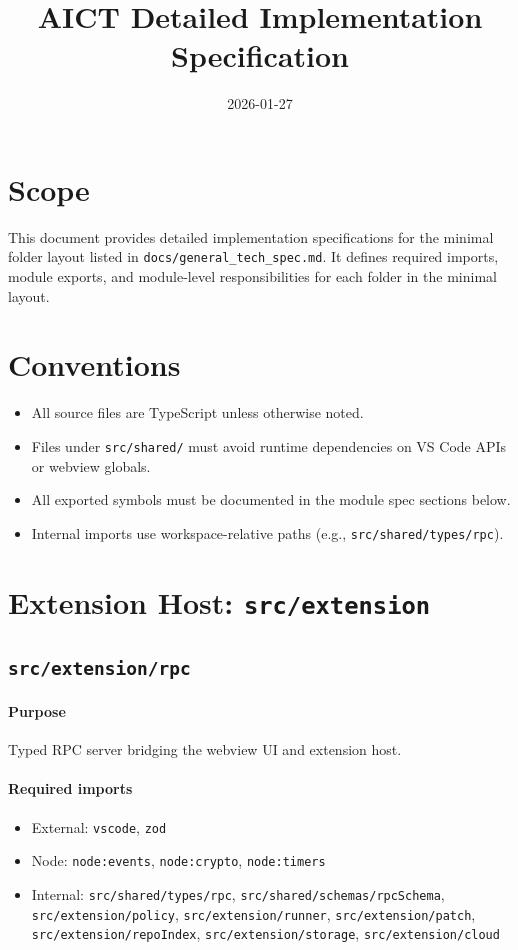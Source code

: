 \documentclass[11pt]{article}
\title{AICT Detailed Implementation Specification}
\author{}
\date{2026-01-27}
\begin{document}
\maketitle
\tableofcontents

\section{Scope}
This document provides detailed implementation specifications for the minimal folder layout
listed in \texttt{docs/general\_tech\_spec.md}. It defines required imports, module exports, and
module-level responsibilities for each folder in the minimal layout.

\section{Conventions}
\begin{itemize}[noitemsep]
  \item All source files are TypeScript unless otherwise noted.
  \item Files under \texttt{src/shared/} must avoid runtime dependencies on VS Code APIs or webview globals.
  \item All exported symbols must be documented in the module spec sections below.
  \item Internal imports use workspace-relative paths (e.g., \texttt{src/shared/types/rpc}).
\end{itemize}

\section{Extension Host: \texttt{src/extension}}

\subsection{\texttt{src/extension/rpc}}
\paragraph{Purpose} Typed RPC server bridging the webview UI and extension host.

\paragraph{Required imports}
\begin{itemize}[noitemsep]
  \item External: \texttt{vscode}, \texttt{zod}
  \item Node: \texttt{node:events}, \texttt{node:crypto}, \texttt{node:timers}
  \item Internal: \texttt{src/shared/types/rpc}, \texttt{src/shared/schemas/rpcSchema},
        \texttt{src/extension/policy}, \texttt{src/extension/runner}, \texttt{src/extension/patch},
        \texttt{src/extension/repoIndex}, \texttt{src/extension/storage}, \texttt{src/extension/cloud}
\end{itemize}
\end{document}
